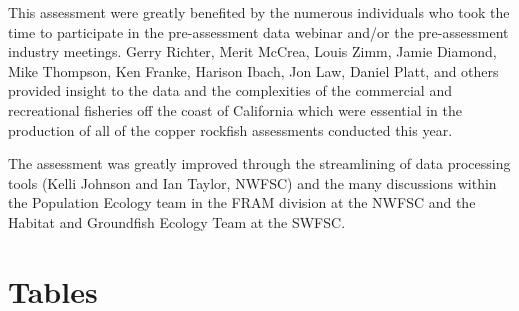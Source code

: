 \documentclass[11pt,
  letterpaper,
]{article}
\begin{document}
This assessment were greatly benefited by the numerous individuals who took the time to participate in the pre-assessment data webinar and/or the pre-assessment industry meetings. Gerry Richter, Merit McCrea, Louis Zimm, Jamie Diamond, Mike Thompson, Ken Franke, Harison Ibach, Jon Law, Daniel Platt, and others provided insight to the data and the complexities of the commercial and recreational fisheries off the coast of California which were essential in the production of all of the copper rockfish assessments conducted this year.

The assessment was greatly improved through the streamlining of data processing tools (Kelli Johnson and Ian Taylor, NWFSC) and the many discussions within the Population Ecology team in the FRAM division at the NWFSC and the Habitat and Groundfish Ecology Team at the SWFSC.

\clearpage

\section{Tables}\label{tables}
\end{document}
